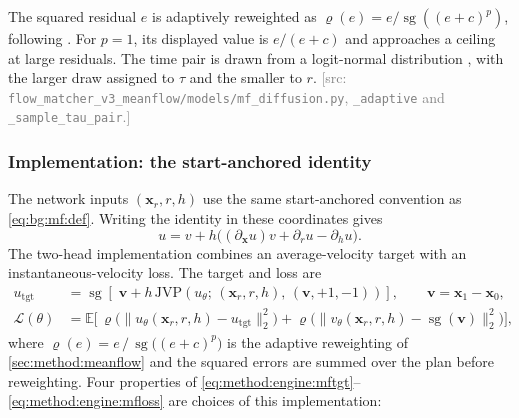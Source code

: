 \documentclass[headsepline,footsepline,footinclude=false,oneside,fontsize=11pt,paper=a4,listof=totoc,bibliography=totoc]{scrbook}
\theoremstyle{definition}
\theoremstyle{plain}
\theoremstyle{remark}
\newcommand{\vect}[1]{\boldsymbol{#1}}
\newcommand{\sidx}[1]{_{\textrm{#1}}}
\newcommand{\E}{\mathbb{E}}                    %
\newcommand{\sg}{\operatorname{sg}}            %
\newcommand{\vfield}{v}                        %
\newcommand{\afield}{u}                        %
\newcommand{\ftime}{\tau}                      %
\newif\ifsubmission
\newcommand{\srcnote}[1]{\ifsubmission\else\textcolor{gray}{\footnotesize\textsf{[src: #1]}}\fi}
\begin{document}
The squared residual $e$ is adaptively reweighted as
$\varrho(e)=e/\sg((e+c)^{p})$, following \parencite[Sec.~4.3]{geng2025meanflow}.
For $p=1$, its displayed value is $e/(e+c)$ and approaches a ceiling at large residuals.
The time pair is drawn from a logit-normal distribution \parencite{esser2024scaling}, with the
larger draw assigned to $\ftime$ and the smaller to $r$.
\srcnote{\texttt{flow\_matcher\_v3\_meanflow/models/mf\_diffusion.py},
\texttt{\_adaptive} and \texttt{\_sample\_tau\_pair}.}

\subsubsection*{Implementation: the start-anchored identity}

The network inputs $(\vect{x}_{r},r,h)$ use the same start-anchored convention as
\eqref{eq:bg:mf:def}. Writing the identity in these coordinates gives
\begin{equation}\label{eq:method:engine:mfid}
  \afield=\vfield+h\big((\partial_{\vect{x}}\afield)\vfield
                            +\partial_r\afield-\partial_h\afield\big).
\end{equation}
The two-head implementation combines an average-velocity target with an instantaneous-velocity
loss. The target and loss are
\begin{align}
  \afield\sidx{tgt}
    &= \sg\!\left[\;\vect{v} + h\,
       \mathrm{JVP}\!\left(\afield_{\theta};\,
         (\vect{x}_{r},r,h),\,(\vect{v},+1,-1)\right)\right],
       \qquad \vect{v} = \vect{x}_{1}-\vect{x}_{0},
       \label{eq:method:engine:mftgt}\\
  \mathcal{L}(\theta)
    &= \E\Big[\,
        \varrho\big(\|\afield_{\theta}(\vect{x}_{r},r,h) - \afield\sidx{tgt}\|_{2}^{2}\big)
      + \varrho\big(\|\vfield_{\theta}(\vect{x}_{r},r,h) - \sg(\vect{v})\|_{2}^{2}\big)\Big],
       \label{eq:method:engine:mfloss}
\end{align}
where $\varrho(e) = e\,/\,\sg\big((e+c)^{p}\big)$ is the adaptive reweighting of
\autoref{sec:method:meanflow} and the squared errors are summed over the plan before reweighting.
Four properties of \eqref{eq:method:engine:mftgt}--\eqref{eq:method:engine:mfloss} are choices of
this implementation:
\end{document}
